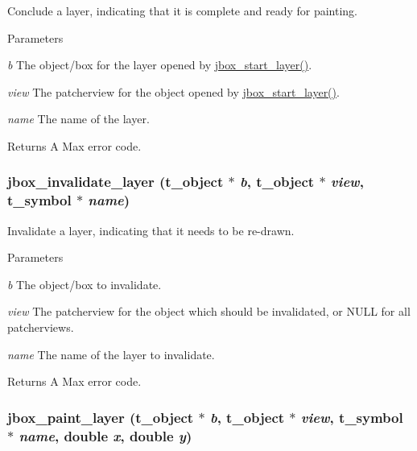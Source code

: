 Conclude a layer, indicating that it is complete and ready for painting. 
\begin{DoxyParams}{Parameters}
\item[{\em b}]The object/box for the layer opened by \hyperlink{group__boxlayer_ga9a6684193d5b946f1e61afebf603ad9c}{jbox\_\-start\_\-layer()}. \item[{\em view}]The patcherview for the object opened by \hyperlink{group__boxlayer_ga9a6684193d5b946f1e61afebf603ad9c}{jbox\_\-start\_\-layer()}. \item[{\em name}]The name of the layer. \end{DoxyParams}
\begin{DoxyReturn}{Returns}
A Max error code. 
\end{DoxyReturn}
\hypertarget{group__boxlayer_gab9ef903725b25eb3e1ab584a9f29f1a4}{
\subsubsection[{jbox\_\-invalidate\_\-layer}]{ jbox\_\-invalidate\_\-layer ({\bf t\_\-object} $\ast$ {\em b}, \/  {\bf t\_\-object} $\ast$ {\em view}, \/  {\bf t\_\-symbol} $\ast$ {\em name})}}
\label{group__boxlayer_gab9ef903725b25eb3e1ab584a9f29f1a4}


Invalidate a layer, indicating that it needs to be re-\/drawn. 
\begin{DoxyParams}{Parameters}
\item[{\em b}]The object/box to invalidate. \item[{\em view}]The patcherview for the object which should be invalidated, or NULL for all patcherviews. \item[{\em name}]The name of the layer to invalidate. \end{DoxyParams}
\begin{DoxyReturn}{Returns}
A Max error code. 
\end{DoxyReturn}
\hypertarget{group__boxlayer_ga87b03b3d160e3a798c7f799773e68750}{
\subsubsection[{jbox\_\-paint\_\-layer}]{ jbox\_\-paint\_\-layer ({\bf t\_\-object} $\ast$ {\em b}, \/  {\bf t\_\-object} $\ast$ {\em view}, \/  {\bf t\_\-symbol} $\ast$ {\em name}, \/  double {\em x}, \/  double {\em y})}}
\label{group__boxlayer_ga87b03b3d160e3a798c7f799773e68750}


